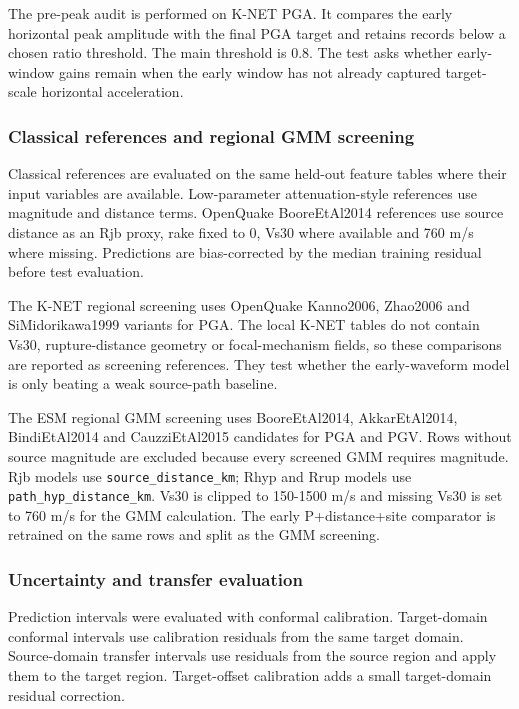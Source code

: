 \documentclass[
  10pt,
]{article}
\begin{document}
The pre-peak audit is performed on K-NET PGA. It compares the early
horizontal peak amplitude with the final PGA target and retains records
below a chosen ratio threshold. The main threshold is 0.8. The test asks
whether early-window gains remain when the early window has not already
captured target-scale horizontal acceleration.

\subsubsection{Classical references and regional GMM
screening}\label{classical-references-and-regional-gmm-screening}

Classical references are evaluated on the same held-out feature tables
where their input variables are available. Low-parameter
attenuation-style references use magnitude and distance terms. OpenQuake
BooreEtAl2014 references use source distance as an Rjb proxy, rake fixed
to 0, Vs30 where available and 760 m/s where missing. Predictions are
bias-corrected by the median training residual before test evaluation.

The K-NET regional screening uses OpenQuake Kanno2006, Zhao2006 and
SiMidorikawa1999 variants for PGA. The local K-NET tables do not contain
Vs30, rupture-distance geometry or focal-mechanism fields, so these
comparisons are reported as screening references. They test whether the
early-waveform model is only beating a weak source-path baseline.

The ESM regional GMM screening uses BooreEtAl2014, AkkarEtAl2014,
BindiEtAl2014 and CauzziEtAl2015 candidates for PGA and PGV. Rows
without source magnitude are excluded because every screened GMM
requires magnitude. Rjb models use \texttt{source\_distance\_km}; Rhyp
and Rrup models use \texttt{path\_hyp\_distance\_km}. Vs30 is clipped to
150-1500 m/s and missing Vs30 is set to 760 m/s for the GMM calculation.
The early P+distance+site comparator is retrained on the same rows and
split as the GMM screening.

\subsubsection{Uncertainty and transfer
evaluation}\label{uncertainty-and-transfer-evaluation}

Prediction intervals were evaluated with conformal calibration.
Target-domain conformal intervals use calibration residuals from the
same target domain. Source-domain transfer intervals use residuals from
the source region and apply them to the target region. Target-offset
calibration adds a small target-domain residual correction.
\end{document}
